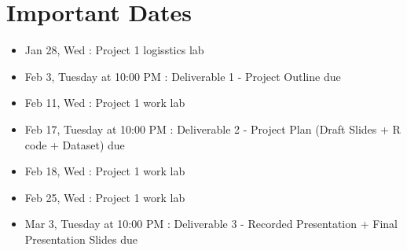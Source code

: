 \documentclass[12pt]{article}
\begin{document}
\section*{Important Dates}
\begin{itemize}
    \item Jan 28, Wed : Project 1 logisstics lab 
    \item Feb 3, Tuesday at 10:00 PM : Deliverable 1 - Project Outline due
    \item Feb 11, Wed : Project 1 work lab
    \item Feb 17, Tuesday at 10:00 PM : Deliverable 2 - Project Plan (Draft Slides + R code + Dataset) due
    \item Feb 18, Wed : Project 1 work lab
    \item Feb 25, Wed : Project 1 work lab
    \item Mar 3, Tuesday at 10:00 PM : Deliverable 3 - Recorded Presentation + Final Presentation Slides due
\end{itemize}
\end{document}
